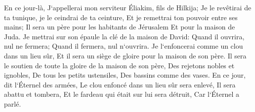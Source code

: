 \verse En ce jour-là, J`appellerai mon serviteur Éliakim, fils de Hilkija; 
\verse Je le revêtirai de ta tunique, je le ceindrai de ta ceinture, Et je remettrai ton pouvoir entre ses mains; Il sera un père pour les habitants de Jérusalem Et pour la maison de Juda. 
\verse Je mettrai sur son épaule la clé de la maison de David: Quand il ouvrira, nul ne fermera; Quand il fermera, nul n`ouvrira. 
\verse Je l`enfoncerai comme un clou dans un lieu sûr, Et il sera un siège de gloire pour la maison de son père. 
\verse Il sera le soutien de toute la gloire de la maison de son père, Des rejetons nobles et ignobles, De tous les petits ustensiles, Des bassins comme des vases. 
\verse En ce jour, dit l`Éternel des armées, Le clou enfoncé dans un lieu sûr sera enlevé, Il sera abattu et tombera, Et le fardeau qui était sur lui sera détruit, Car l`Éternel a parlé. 

\chapter{}

